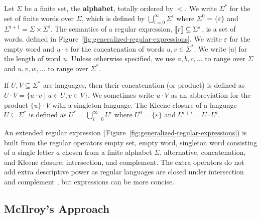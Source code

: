 Let $\Sigma$ be a finite set, the \textbf{alphabet}, totally ordered by $<$.  We write
$\Sigma^*$ for the set of finite words over $\Sigma$, which is defined
by $\bigcup_{i=0}^\infty \Sigma^i$ where $\Sigma^0 = \{\varepsilon\}$
and $\Sigma^{i+1} = \Sigma \times \Sigma^i$.
The
semantics of a regular expression, $\llbracket r\rrbracket \subseteq \Sigma^*$, is a set of
words, defined in Figure~\ref{fig:generalized-regular-expressions}.
We write
$\varepsilon$ for the empty word and $u\cdot v$ for the concatenation
of words $u, v \in \Sigma^*$. We write $|u|$ for the length of word
$u$. Unless otherwise specified, we use $a, b, c, \dots$ to range over
$\Sigma$ and $u, v, w, \dots$ to range over $\Sigma^*$.

If $U, V \subseteq \Sigma^*$ are
languages, then their concatenation (or product) is defined as $U\cdot
V = \{ u\cdot v \mid u\in U, v\in V\}$. We sometimes write $u\cdot V$
as an abbreviation for the product $\{u\}\cdot V$ with a singleton
language. The Kleene closure of a
language $U\subseteq \Sigma^*$ is defined as $U^* =
\bigcup_{i=0}^\infty U^i$ where $U^0 = \{\varepsilon\}$ and $U^{i+i} =
U \cdot U^i$. 

An extended regular expression
(Figure~\ref{fig:generalized-regular-expressions}) is built from the
regular operators empty set, empty word, singleton word consisting of
a single letter $a$ chosen from a finite alphabet $\Sigma$,
alternative, concatenation, and Kleene closure, intersection, and complement. The extra
operators 
do not add extra descriptive power as regular languages are closed
under intersection and complement \cite{DBLP:books/daglib/0011126},
but expressions can be more concise.


\subsection{McIlroy's Approach}
\label{sec:naive-approach}


